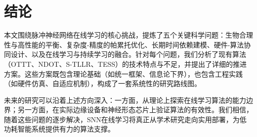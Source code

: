 \documentclass{article}
\begin{document}
\section{结论}

本文围绕脉冲神经网络在线学习的核心挑战，提炼了五个关键科学问题：生物合理性与高性能的平衡、复杂度-精度的帕累托优化、长期时间依赖建模、硬件-算法协同设计、以及在线学习与持续学习的融合。针对每个问题，我们分析了现有算法（OTTT、NDOT、S-TLLR、TESS）的技术特点与不足，并提出了详细的推进方案。这些方案既包含理论基础（如统一框架、信息论下界），也包含工程实践（如硬件仿真、自适应机制），构成了一套系统性的研究路线图。

未来的研究可以沿着上述方向深入：一方面，从理论上探索在线学习算法的能力边界；另一方面，在实际边缘设备和神经形态芯片上验证算法的有效性。我们相信，随着这些问题的逐步解决，SNN在线学习将真正从学术研究走向实用部署，为低功耗智能系统提供有力的算法支撑。
\end{document}
